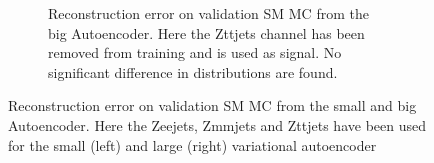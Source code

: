 \begin{figure}[H]
\begin{subfigure}{.45\textwidth}
        \caption{Reconstruction error on validation SM MC from the big Autoencoder. Here the Zttjets channel has been removed from training and 
        is used as signal. No significant difference in distributions are found. }
        \label{fig:vae_big_Zttjets}
    \end{subfigure}
    \hfill  
    \caption[VAE | Channel removal, Zeejets, Zmmjets, Zttjets]{Reconstruction error on validation SM MC from the small and big Autoencoder. 
    Here the Zeejets, Zmmjets and Zttjets have been used for the small (left) and large (right) variational autoencoder}
    \label{fig:vae_big_channel5}
\end{figure}

